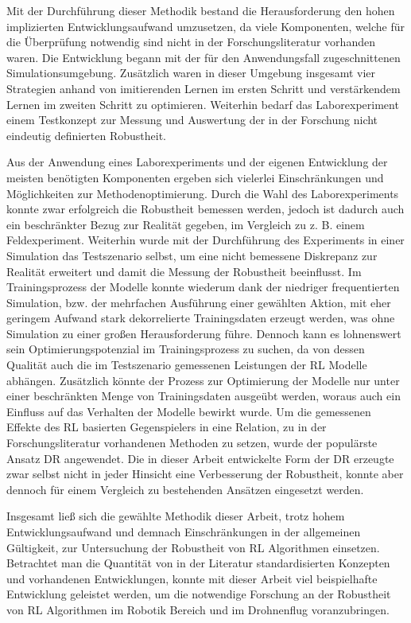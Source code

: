 Mit der Durchführung dieser Methodik bestand die Herausforderung den hohen implizierten Entwicklungsaufwand umzusetzen, da viele Komponenten, welche für die Überprüfung notwendig sind nicht in der Forschungsliteratur vorhanden waren.
Die Entwicklung begann mit der für den Anwendungsfall zugeschnittenen Simulationsumgebung.
Zusätzlich waren in dieser Umgebung insgesamt vier Strategien anhand von imitierenden Lernen im ersten Schritt und verstärkendem Lernen im zweiten Schritt zu optimieren. 
Weiterhin bedarf das Laborexperiment einem Testkonzept zur Messung und Auswertung der in der Forschung nicht eindeutig definierten Robustheit.

Aus der Anwendung eines Laborexperiments und der eigenen Entwicklung der meisten benötigten Komponenten ergeben sich vielerlei Einschränkungen und Möglichkeiten zur Methodenoptimierung. %
Durch die Wahl des Laborexperiments konnte zwar erfolgreich die Robustheit bemessen werden, jedoch ist dadurch auch ein beschränkter Bezug zur Realität gegeben, im Vergleich zu z. B. einem Feldexperiment.
Weiterhin wurde mit der Durchführung des Experiments in einer Simulation das Testszenario selbst, um eine nicht bemessene Diskrepanz zur Realität erweitert und damit die Messung der Robustheit beeinflusst.
Im Trainingsprozess der Modelle konnte wiederum dank der niedriger frequentierten Simulation, bzw. der mehrfachen Ausführung einer gewählten Aktion, mit eher geringem Aufwand stark dekorrelierte Trainingsdaten erzeugt werden, was ohne Simulation zu einer großen Herausforderung führe.
Dennoch kann es lohnenswert sein Optimierungspotenzial im Trainingsprozess zu suchen, da von dessen Qualität auch die im Testszenario gemessenen Leistungen der RL Modelle abhängen.
Zusätzlich könnte der Prozess zur Optimierung der Modelle nur unter einer beschränkten Menge von Trainingsdaten ausgeübt werden, woraus auch ein Einfluss auf das Verhalten der Modelle bewirkt wurde.
Um die gemessenen Effekte des RL basierten Gegenspielers in eine Relation, zu in der Forschungsliteratur vorhandenen Methoden zu setzen, wurde der populärste Ansatz DR angewendet.
Die in dieser Arbeit entwickelte Form der DR erzeugte zwar selbst nicht in jeder Hinsicht eine Verbesserung der Robustheit, konnte aber dennoch für einem Vergleich zu bestehenden Ansätzen eingesetzt werden.

Insgesamt ließ sich die gewählte Methodik dieser Arbeit, trotz hohem Entwicklungsaufwand und demnach Einschränkungen in der allgemeinen Gültigkeit, zur Untersuchung der Robustheit von RL Algorithmen einsetzen.
Betrachtet man die Quantität von in der Literatur standardisierten Konzepten und vorhandenen Entwicklungen, konnte mit dieser Arbeit viel beispielhafte Entwicklung geleistet werden, um die notwendige Forschung an der Robustheit von RL Algorithmen im Robotik Bereich und im Drohnenflug voranzubringen.

